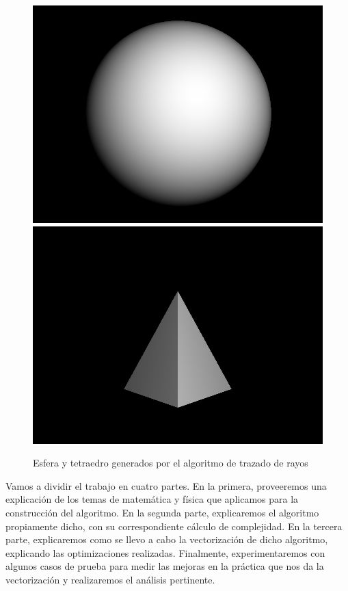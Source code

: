 \begin{figure}[H]
	\begin{center}
		\includegraphics[scale=0.2]{sphere1.jpg}
		\hspace{1.5cm}
		\includegraphics[scale=0.2]{tetrahedron1.jpg}
	\end{center}		
	\caption{Esfera y tetraedro generados por el algoritmo de trazado de rayos}
	\label{fig1}
\end{figure}

Vamos a dividir el trabajo en cuatro partes. En la primera, proveeremos una explicación de los temas de matemática y física que aplicamos para la construcción del algoritmo. En la segunda parte,  explicaremos el algoritmo propiamente dicho, con su correspondiente cálculo de complejidad. En la tercera parte, explicaremos como se llevo a cabo la vectorización de dicho algoritmo, explicando las optimizaciones realizadas. Finalmente, experimentaremos con algunos casos de prueba para medir las mejoras en la práctica que nos da la vectorización y realizaremos el análisis pertinente.
